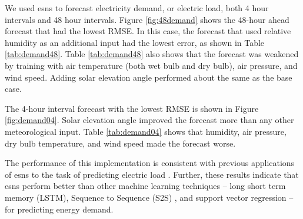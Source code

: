 We used \glspl{esn} to forecast electricity demand, or electric load, both
4 hour intervals and 48 hour intervals. Figure \ref{fig:48demand} shows the
48-hour ahead forecast that had the lowest RMSE. In this case, the forecast
that used relative humidity as an additional input had the lowest error, as
shown in Table \ref{tab:demand48}. Table \ref{tab:demand48} also shows that the
forecast was weakened by training with air temperature (both wet bulb and dry
bulb), air pressure, and wind speed. Adding solar elevation angle performed
about the same as the base case.

The 4-hour interval forecast with the lowest
RMSE is shown in Figure \ref{fig:demand04}. Solar elevation angle improved the
forecast more than any other meteorological input. Table \ref{tab:demand04}
shows that humidity, air pressure, dry bulb temperature, and wind speed made the
forecast worse.

The performance of this implementation is consistent with previous applications
of \glspl{esn} to the task of predicting electric load
\cite{deihimi_application_2012}. Further, these results indicate that
\glspl{esn} perform better than other machine learning techniques -- long
short term memory (LSTM)\cite{marino_building_2016}, Sequence to Sequence (S2S)
\cite{marino_building_2016}, and support vector regression \cite{chen_day-ahead_2017} -- for predicting energy demand.

\begin{figure*}[h]
  \centering
  
  \caption{The optimized 48-hour ahead demand prediction. The inputs for this forecast were hourly demand and relative humidity. \textit{Hyperparameters}:  Reservoir Size:1500, Sparsity: 0.2, Spectral Radius: 1.5, Noise: 0.0007, Training Length: 5000, Prediction Window: 48, Random state: 85}
  \label{fig:48demand}
\end{figure*}

